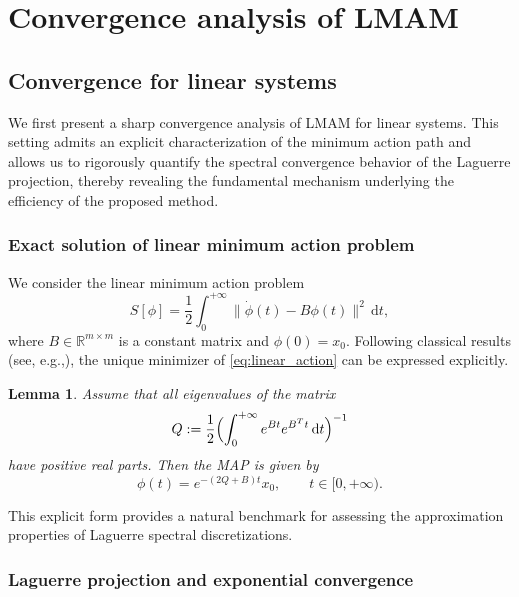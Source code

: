 \documentclass[a4paper,fleqn, 12pt]{cas-sc}
\newtheorem{lemma}{Lemma}
\newcommand{\diff}{\,\mathrm{d}}
\numberwithin{table}{section}
\begin{document}
\section{Convergence analysis of LMAM}
\label{Spectral Properties}
\subsection{Convergence  for linear systems}
\label{Convergence  for Linear Systems}
We first present a sharp convergence analysis of LMAM for linear systems. This setting admits an explicit characterization of the minimum
action path and allows us to rigorously quantify the spectral convergence behavior of the Laguerre
projection, thereby revealing the fundamental mechanism underlying the efficiency of the proposed
method.
\subsubsection{Exact solution of linear minimum action problem }

We consider the linear minimum action problem
\begin{equation}
S[\phi]
=
\frac{1}{2}
\int_0^{+\infty}
\|\dot{\phi}(t) - B \phi(t)\|^2 \diff t,
\label{eq:linear_action}
\end{equation}
where $B \in \mathbb{R}^{m \times m}$ is a constant matrix and $\phi(0)=x_0$.
Following classical results (see, e.g.,{\cite{chen_asymptotic_2006}}), the unique minimizer of \eqref{eq:linear_action}
can be expressed explicitly.

\begin{lemma}
\label{lem:linear_exact}
Assume that all eigenvalues of the matrix
\[
Q := \frac12 \Bigl( \int_0^{+\infty} e^{Bt} e^{B^{T}t} \diff t \Bigr)^{-1}
\]
have positive real parts. Then the MAP is given by
\[
\phi(t) = e^{-(2Q+B)t} x_0, \qquad t \in [0,+\infty).
\]
\end{lemma}

This explicit form provides a natural benchmark for assessing the approximation properties of
Laguerre spectral discretizations.

\subsubsection{Laguerre projection and exponential convergence }
\end{document}
